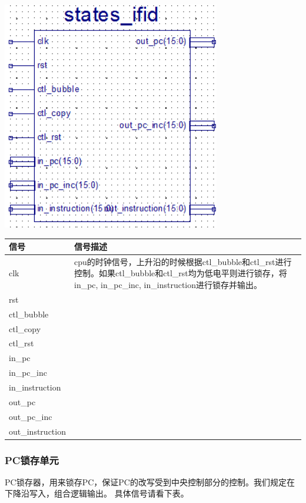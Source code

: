 \begin{center}
    \includegraphics[height=10cm]{image/detail/detail_0.png}

    \begin{tabulary}{1.0\textwidth}{|L|L|}
        \hline 信号 & 信号描述 \\
        \hline clk & cpu的时钟信号，上升沿的时候根据ctl\_bubble和ctl\_rst进行控制。如果ctl\_bubble和ctl\_rst均为低电平则进行锁存，将in\_pc, in\_pc\_inc, in\_instruction进行锁存并输出。 \\
        \hline rst &  \\
        \hline ctl\_bubble &  \\
        \hline ctl\_copy &  \\
        \hline ctl\_rst &  \\
        \hline in\_pc &  \\
        \hline in\_pc\_inc &  \\
        \hline in\_instruction &  \\
        \hline out\_pc &  \\
        \hline out\_pc\_inc &  \\
        \hline out\_instruction &  \\
        \hline
    \end{tabulary}

\end{center}
    

\subsubsection{PC锁存单元}
    PC锁存器，用来锁存PC，保证PC的改写受到中央控制部分的控制。我们规定在下降沿写入，组合逻辑输出。
    具体信号请看下表。